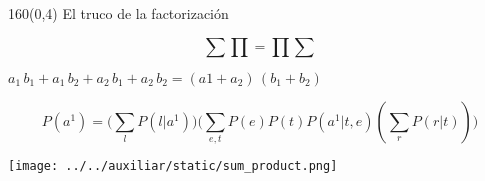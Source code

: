 \documentclass[shownotes,aspectratio=169]{beamer}
\begin{document}
%
%
%
%
%
%
%
%
%
%
%
%
%


\begin{frame}[plain]
\begin{textblock}{160}(0,4)
 \centering \Large El truco de la factorización
\end{textblock}
\vspace{1.5cm} \centering

\begin{equation*}
\sum \prod = \prod \sum
\end{equation*}

$a_1 \, b_1 + a_1 \, b_2 + a_2 \, b_1 + a_2 \, b_2  = (a1 + a_2) \, (b_1 + b_2)$

\pause

\begin{equation*}
   P(a^1) = \Big(\sum_l P(l|a^1) \Big) \Big(\sum_{e,t} P(e)P(t)P(a^1|t,e)(\sum_r P(r|t)) \Big)
\end{equation*}

  \texttt{[image: ../../auxiliar/static/sum\_product.png]}

\end{frame}
\end{document}
